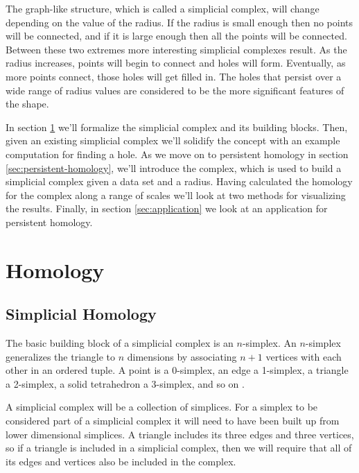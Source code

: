 The graph-like structure, which is called a simplicial complex, will change depending on the value of the radius.
If the radius is small enough then no points will be connected, and if it is large enough then all the points will be connected.
Between these two extremes more interesting simplicial complexes result.
As the radius increases, points will begin to connect and holes will form.
Eventually, as more points connect, those holes will get filled in.
The holes that persist over a wide range of radius values are considered to be the more significant features of the shape.

In section \ref{sec:homology} we'll formalize the simplicial complex and its building blocks.
Then, given an existing simplicial complex we'll solidify the concept with an example computation for finding a hole.
As we move on to persistent homology in section \ref{sec:persistent-homology}, we'll introduce the \cech complex, which is used to build a simplicial complex given a data set and a radius.
Having calculated the homology for the \cech complex along a range of scales we'll look at two methods for visualizing the results.
Finally, in section \ref{sec:application} we look at an application for persistent homology.

\section{Homology}\label{sec:homology}

\subsection{Simplicial Homology}\label{sec:simplicial-homology}

The basic building block of a simplicial complex is an \(n\)-simplex. %
An \(n\)-simplex generalizes the triangle to \(n\) dimensions by associating \(n+1\) vertices with each other in an ordered tuple.
A point is a 0-simplex, an edge a 1-simplex, a triangle a 2-simplex, a solid tetrahedron a 3-simplex, and so on .

\begin{figure}
    
    \caption{}
    \label{fig:basic-simplices}
\end{figure}

A simplicial complex will be a collection of simplices.
For a simplex to be considered part of a simplicial complex it will need to have been built up from lower dimensional simplices.
A triangle includes its three edges and three vertices, so if a triangle is included in a simplicial complex, then we will require that all of its edges and vertices also be included in the complex.

